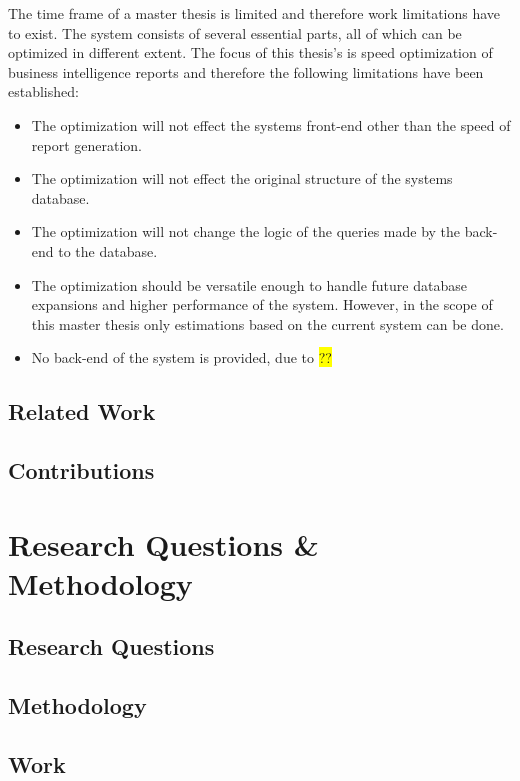 \documentclass{cslthse-msc}
\newcommand{\hilight}[1]{\colorbox{yellow}{#1}}
\begin{document}
The time frame of a master thesis is limited and therefore work limitations have to exist. The system consists of several essential parts, all of which can be optimized in different extent. The focus of this thesis's is speed optimization of business intelligence reports and therefore the following limitations have been established:
\begin{itemize}
\item The optimization will not effect the systems front-end other than the speed of report generation.
\item The optimization will not effect the original structure of the systems database.
\item The optimization will not change the logic of the queries made by the back-end to the database.
\item The optimization should be versatile enough to handle future database expansions and higher performance of the system. However, in the scope of this master thesis only estimations based on the current system can be done.
\item No back-end of the system is provided, due to \hilight{??}
\end{itemize}

\section{Related Work}

\section{Contributions}

\chapter{Research Questions \& Methodology}

\section{Research Questions}

\section{Methodology}

\section{Work}
\end{document}
